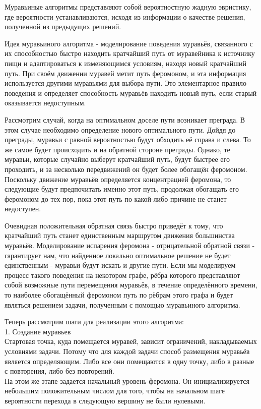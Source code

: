 \documentclass[12pt]{report}
\begin{document}
Муравьиные алгоритмы представляют собой вероятностную жадную эвристику, где вероятности устанавливаются, исходя из информации о качестве решения, полученной из предыдущих решений.

Идея муравьиного алгоритма - моделирование поведения муравьёв, связанного с их способностью быстро находить кратчайший путь от муравейника к источнику пищи и адаптироваться к изменяющимся условиям, находя новый кратчайший путь. При своём движении муравей метит путь феромоном, и эта информация используется другими муравьями для выбора пути. Это элементарное правило поведения и определяет способность муравьёв находить новый путь, если старый оказывается недоступным.

Рассмотрим случай, когда на оптимальном доселе пути возникает преграда. В этом случае необходимо определение нового оптимального пути. Дойдя до преграды, муравьи с равной вероятностью будут обходить её справа и слева. То же самое будет происходить и на обратной стороне преграды. Однако, те муравьи, которые случайно выберут кратчайший путь, будут быстрее его проходить, и за несколько передвижений он будет более обогащён феромоном. Поскольку движение муравьёв определяется концентрацией феромона, то следующие будут предпочитать именно этот путь, продолжая обогащать его феромоном до тех пор, пока этот путь по какой-либо причине не станет недоступен.

Очевидная положительная обратная связь быстро приведёт к тому, что кратчайший путь станет единственным маршрутом движения большинства муравьёв. Моделирование испарения феромона - отрицательной обратной связи - гарантирует нам, что найденное локально оптимальное решение не будет единственным - муравьи будут искать и другие пути. Если мы моделируем процесс такого поведения на некотором графе, рёбра которого представляют собой возможные пути перемещения муравьёв, в течение определённого времени, то наиболее обогащённый феромоном путь по рёбрам этого графа и будет являться решением задачи, полученным с помощью муравьиного алгоритма.


Теперь рассмотрим шаги для реализации этого алгоритма:\\

1. Создание муравьев\\
Стартовая точка, куда помещается муравей, зависит ограничений,   накладываемых условиями задачи. Потому что для каждой задачи   способ размещения муравьёв является определяющим. Либо все    они помещаются в одну точку, либо в разные с повторения, либо    без повторений. \\
На этом же этапе задается начальный уровень феромона. Он    инициализируется небольшим положительным числом для того,    чтобы на начальном шаге вероятности перехода в следующую    вершину не были нулевыми. \\
\end{document}
